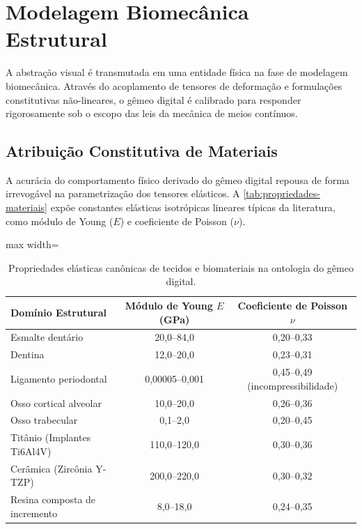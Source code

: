 \section{Modelagem Biomecânica Estrutural}
\label{sec:modelagem}

A abstração visual é transmutada em uma entidade física na fase de modelagem biomecânica. Através do acoplamento de tensores de deformação e formulações constitutivas não-lineares, o gêmeo digital é calibrado para responder rigorosamente sob o escopo das leis da mecânica de meios contínuos.

\subsection{Atribuição Constitutiva de Materiais}
\label{subsec:materiais}

A acurácia do comportamento físico derivado do gêmeo digital repousa de forma irrevogável na parametrização dos tensores elásticos. A \autoref{tab:propriedades-materiais} expõe constantes elásticas isotrópicas lineares típicas da literatura, como módulo de Young ($E$) e coeficiente de Poisson ($\nu$).

\begin{table}[htb]
\centering
\caption{Propriedades elásticas canônicas de tecidos e biomateriais na ontologia do gêmeo digital.}
\label{tab:propriedades-materiais}
\begin{adjustbox}{max width=\textwidth}
\begin{tabular}{lcc}
\toprule
\textbf{Domínio Estrutural} & \textbf{Módulo de Young $E$ (GPa)} & \textbf{Coeficiente de Poisson $\nu$} \\
\midrule
Esmalte dentário & 20,0--84,0 & 0,20--0,33 \\
Dentina & 12,0--20,0 & 0,23--0,31 \\
Ligamento periodontal & 0,00005--0,001 & 0,45--0,49 (incompressibilidade) \\
Osso cortical alveolar & 10,0--20,0 & 0,26--0,36 \\
Osso trabecular & 0,1--2,0 & 0,20--0,45 \\
Titânio (Implantes Ti6Al4V) & 110,0--120,0 & 0,30--0,36 \\
Cerâmica (Zircônia Y-TZP) & 200,0--220,0 & 0,30--0,32 \\
Resina composta de incremento & 8,0--18,0 & 0,24--0,35 \\
\bottomrule
\end{tabular}
\end{adjustbox}
\end{table}

